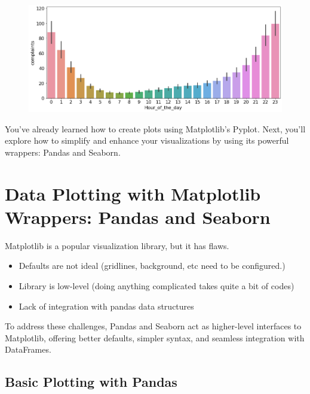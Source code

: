 \documentclass[
  letterpaper,
  DIV=11,
  numbers=noendperiod]{scrreprt}
\providecommand{\tightlist}{%
  \setlength{\itemsep}{0pt}\setlength{\parskip}{0pt}}\usepackage{longtable,booktabs,array}
\begin{document}
\begin{figure}[H]

{\centering \includegraphics{Data visualization_files/figure-pdf/cell-27-output-1.png}

}

\end{figure}

You've already learned how to create plots using Matplotlib's Pyplot.
Next, you'll explore how to simplify and enhance your visualizations by
using its powerful wrappers: Pandas and Seaborn.

\hypertarget{data-plotting-with-matplotlib-wrappers-pandas-and-seaborn}{%
\section{Data Plotting with Matplotlib Wrappers: Pandas and
Seaborn}\label{data-plotting-with-matplotlib-wrappers-pandas-and-seaborn}}

Matplotlib is a popular visualization library, but it has flaws.

\begin{itemize}
\tightlist
\item
  Defaults are not ideal (gridlines, background, etc need to be
  configured.)
\item
  Library is low-level (doing anything complicated takes quite a bit of
  codes)
\item
  Lack of integration with pandas data structures
\end{itemize}

To address these challenges, Pandas and Seaborn act as higher-level
interfaces to Matplotlib, offering better defaults, simpler syntax, and
seamless integration with DataFrames.

\hypertarget{basic-plotting-with-pandas}{%
\subsection{Basic Plotting with
Pandas}\label{basic-plotting-with-pandas}}
\end{document}
